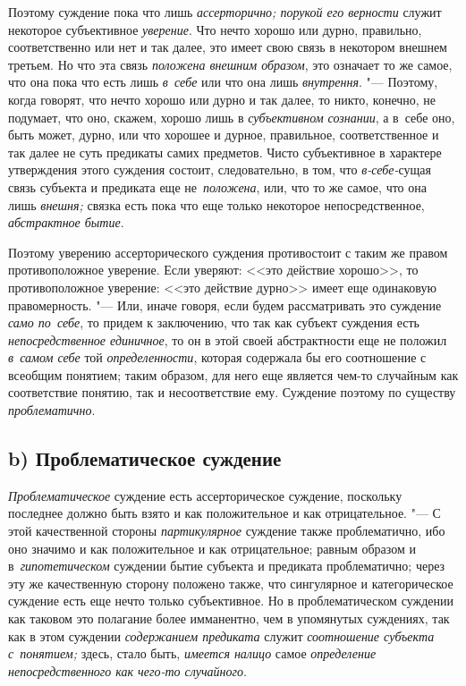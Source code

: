 Поэтому суждение пока что лишь {\em ассерторично; порукой его верности}
служит некоторое субъективное {\em уверение}. Что нечто
хорошо или дурно, правильно, соответственно или нет и так далее, это имеет
свою связь в некотором внешнем третьем. Но что эта связь
{\em положена внешним образом},
это означает то же самое, что она пока что есть лишь
{\em в~себе} или что она лишь {\em внутрення}. "---
Поэтому, когда говорят, что нечто хорошо или дурно и так
далее, то никто, конечно, не подумает, что оно, скажем, хорошо лишь в
{\em субъективном сознании},
а в~себе оно, быть может, дурно, или что хорошее и дурное,
правильное, соответственное и так далее не суть предикаты самих предметов.
Чисто субъективное в характере утверждения этого суждения состоит,
следовательно, в том, что {\em в-себе-}сущая связь субъекта и предиката еще
не~{\em положена}, или, что то же самое, что она лишь {\em внешня;} связка
есть пока что еще только некоторое непосредственное, {\em абстрактное бытие}.

Поэтому уверению ассерторического суждения противостоит с таким
же правом противоположное уверение. Если уверяют: <<это действие
хорошо>>, то противоположное уверение: <<это действие дурно>> имеет еще
одинаковую правомерность. "--- Или, иначе говоря, если будем
рассматривать это суждение {\em само по~себе}, то придем к заключению, что
так как субъект суждения есть {\em непосредственное единичное}, то он в этой
своей абстрактности еще не положил {\em в~самом себе} той {\em определенности},
которая содержала бы его соотношение с всеобщим понятием; таким образом,
для него еще является чем-то случайным как соответствие понятию, так и
несоответствие ему. Суждение поэтому по существу {\em проблематично}.

\subsection[b) Проблематическое суждение]{b) Проблематическое суждение}
{\em Проблематическое} суждение есть ассерторическое суждение, поскольку
последнее должно быть взято и как положительное и как отрицательное. "---
С этой качественной стороны {\em партикулярное}
суждение также проблематично, ибо оно значимо и как
положительное и как отрицательное; равным образом и в~{\em гипотетическом}
суждении бытие субъекта и предиката проблематично; через эту
же качественную сторону положено также, что сингулярное и категорическое
суждение есть еще нечто только субъективное. Но в проблематическом суждении
как таковом это полагание более имманентно, чем в упомянутых суждениях, так
как в этом суждении {\em содержанием предиката} служит {\em соотношение
субъекта с~понятием;} здесь, стало быть, {\em имеется налицо} самое
{\em определение непосредственного как чего-то случайного}.


